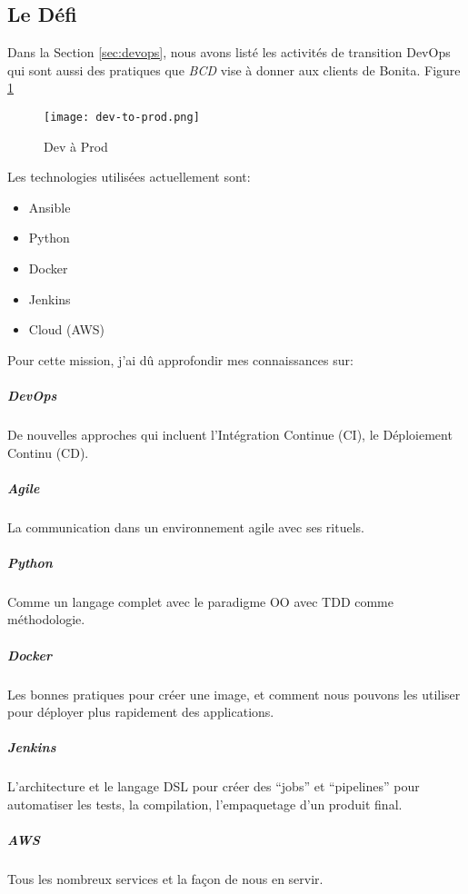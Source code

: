 \subsection{Le Défi}
Dans la Section \ref{sec:devops}, nous avons listé les activités de transition DevOps qui sont aussi des pratiques que \emph{BCD} vise à donner aux clients de Bonita. Figure \ref{fig:dev-to-prod}

\begin{figure}[!ht]
\centering
\texttt{[image: dev-to-prod.png]}
\caption{Dev à Prod}
\label{fig:dev-to-prod}
\end{figure}

Les technologies utilisées actuellement sont:
\begin{itemize}
  \item Ansible
  \item Python
  \item Docker
  \item Jenkins
  \item Cloud (AWS)
\end{itemize}

Pour cette mission, j'ai dû approfondir mes connaissances sur:
\subparagraph{DevOps} De nouvelles approches qui incluent l'Intégration Continue (CI), le Déploiement Continu (CD).
\subparagraph{Agile} La communication dans un environnement agile avec ses rituels.
\subparagraph{Python} Comme un langage complet avec le paradigme OO avec TDD comme méthodologie.
\subparagraph{Docker} Les bonnes pratiques pour créer une image, et comment nous pouvons les utiliser pour déployer plus rapidement des applications.
\subparagraph{Jenkins} L’architecture et le langage DSL pour  créer des \enquote{jobs} et \enquote{pipelines} pour automatiser les tests, la compilation, l’empaquetage d'un produit final.
\subparagraph{AWS} Tous les nombreux services et la façon de nous en servir.

